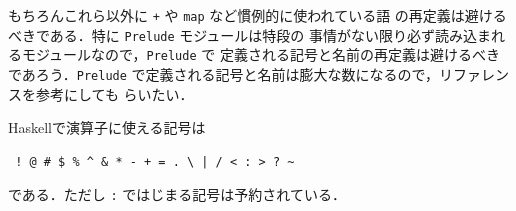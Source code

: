 \documentclass[a5paper,twoside,fleqn]{jsbook}
\newcommand{\programminglanguage}[1]{\textsf{#1}}
\newcommand{\haskell}{\programminglanguage{Haskell}}
\newcommand{\code}[1]{\texttt{#1}}
\newcommand{\filename}[1]{\texttt{#1}}
\begin{document}
もちろんこれら以外に \code{+} や \code{map} など慣例的に使われている語
の再定義は避けるべきである．特に \filename{Prelude} モジュールは特段の
事情がない限り必ず読み込まれるモジュールなので，\filename{Prelude} で
定義される記号と名前の再定義は避けるべきであろう．\filename{Prelude}
で定義される記号と名前は膨大な数になるので，リファレンスを参考にしても
らいたい．

\haskell で演算子に使える記号は
\begin{verbatim}
 ! @ # $ % ^ & * - + = . \ | / < : > ? ~
\end{verbatim}%
である．ただし \code{:} ではじまる記号は予約されている．

\end{document}

